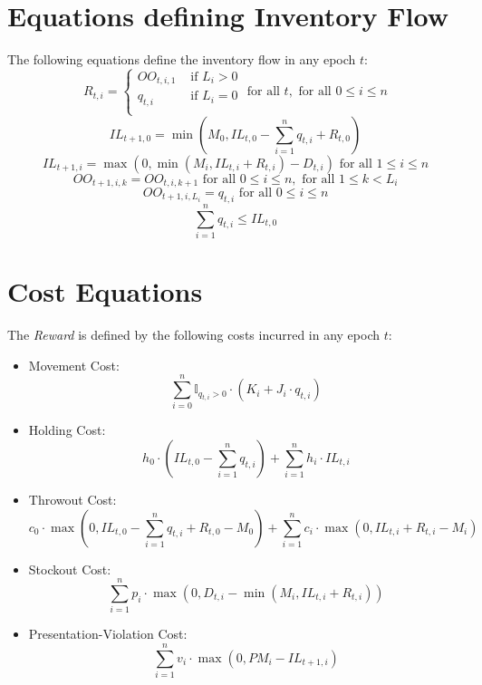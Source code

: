 \documentclass[12pt]{amsart}
\begin{document}
\section{Equations defining Inventory Flow}
The following equations define the inventory flow in any epoch $t$:
$$R_{t,i} =
\begin{cases}
OO_{t,i,1} & \text{ if } L_i > 0\\
q_{t,i} & \text{ if } L_i = 0\\
\end{cases}
\mbox{ for all } t, \mbox{ for all } 0 \leq i \leq n$$
$$IL_{t+1,0} = \min(M_0, IL_{t,0} - \sum_{i=1}^n q_{t,i} + R_{t,0})$$
$$IL_{t+1,i} = \max(0, \min(M_i, IL_{t,i} + R_{t,i}) - D_{t,i}) \mbox{ for all } 1 \leq i \leq n$$
$$OO_{t+1,i,k} = OO_{t,i,k+1} \mbox{ for all } 0 \leq i \leq n, \mbox{ for all } 1 \leq k < L_i$$
$$OO_{t+1,i,L_i} = q_{t,i}  \mbox{ for all } 0 \leq i \leq n$$
$$\sum_{i=1}^n q_{t,i} \leq IL_{t,0} $$

\section{Cost Equations}
The {\em Reward} is defined by the following costs incurred in any epoch $t$:
\begin{itemize}
\item Movement Cost:
$$\sum_{i=0}^n \mathbb{I}_{q_{t,i} > 0} \cdot (K_i + J_i \cdot q_{t,i})$$
\item Holding Cost:
$$h_0 \cdot (IL_{t,0} - \sum_{i=1}^n q_{t,i}) + \sum_{i=1}^n h_i \cdot IL_{t,i}$$
\item Throwout Cost:
$$c_0 \cdot \max(0, IL_{t,0} - \sum_{i=1}^n q_{t,i} + R_{t,0} - M_0) + \sum_{i=1}^n c_i \cdot \max(0, IL_{t,i} + R_{t,i} - M_i)$$ 
\item Stockout Cost:
$$ \sum_{i=1}^n p_i \cdot \max(0, D_{t,i} - \min(M_i, IL_{t,i} + R_{t,i}))$$
\item Presentation-Violation Cost:
$$\sum_{i=1}^n v_i \cdot \max(0, PM_i - IL_{t+1,i})$$
\end{itemize}
\end{document}
